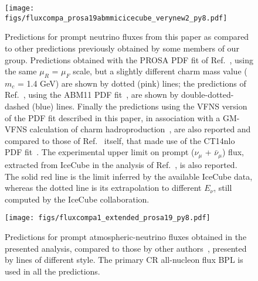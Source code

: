 \begin{figure}
\centering
    \texttt{[image: figs/fluxcompa\_prosa19abmmicicecube\_verynew2\_py8.pdf]}
  \caption{\label{fig3prompt} 
Predictions for prompt neutrino fluxes from this paper as compared to other predictions previously obtained by some members of our group. Predictions obtained with the PROSA PDF fit of Ref.~\cite{Zenaiev:2015rfa}, using the same $\mu_R$ = $\mu_F$ scale, but a slightly different charm mass value ($m_c$ = 1.4 GeV) are shown by dotted (pink) lines; the predictions of Ref.~\cite{Garzelli:2015psa}, using the ABM11 PDF fit~\cite{Alekhin:2012ig}, are shown by double-dotted-dashed (blue) lines. Finally the predictions using the VFNS version of the PDF fit described in this paper, in association with a GM-VFNS calculation of charm hadroproduction~\cite{Benzke:2017yjn}, are also reported and compared to those of Ref.~\cite{Benzke:2017yjn} itself, that made use of the CT14nlo PDF fit~\cite{Dulat:2015mca}. 
The experimental upper limit on prompt ($\nu_\mu$ + $\bar{\nu}_\mu$) flux, extracted from IceCube in the analysis of Ref.~\cite{Aartsen:2016xlq}, is also reported. The solid red line is the limit inferred by the available IceCube data, whereas the dotted line is its extrapolation to different $E_\nu$, still computed by the IceCube collaboration.}
\end{figure}


\begin{figure}
\centering
    \texttt{[image: figs/fluxcompa1\_extended\_prosa19\_py8.pdf]}
  \caption{\label{fig4prompt} Predictions for prompt atmospheric-neutrino fluxes obtained in the presented analysis, compared to those by other authors~\cite{Garzelli:2015psa, Gondolo:1995fq, Enberg:2008te, Bhattacharya:2015jpa, Gauld:2015kvh, Fedynitch:2015zma}, presented by lines of different style. The primary CR all-nucleon flux BPL is used in all the predictions.}
\end{figure}

